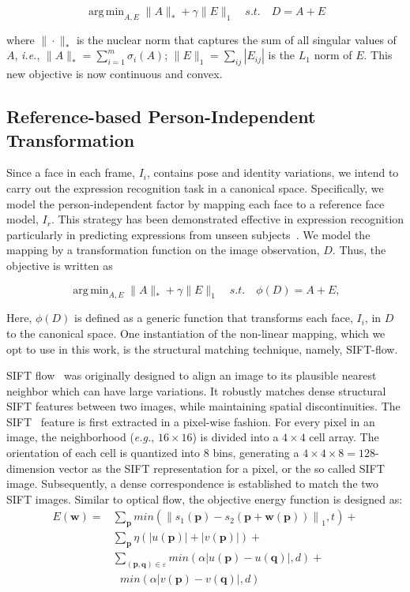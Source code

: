 \documentclass[journal]{IEEEtran}
\DeclareMathOperator*{\argmin}{arg\,min}
\begin{document}
\begin{equation} \label{eq:rpca}
\argmin_{A,E} \|A\|_*+\gamma \|E\|_1  \quad s.t. \quad D = A + E 
\end{equation}

\noindent where $\|\cdot\|_*$ is the nuclear norm that captures the sum of all singular values of $A$, \textit{i.e.}, $\|A\|_*=\sum^m_{i=1}\sigma_i(A)$; $\|E\|_1=\sum_{ij}|E_{ij}|$ is the $L_1$ norm of $E$. This new objective is now continuous and convex. 


\subsection{Reference-based Person-Independent Transformation} 

Since a face in each frame, $I_i$, contains pose and identity variations, we intend to carry out the expression recognition task in a canonical space. Specifically, we model the person-independent factor by mapping each face to a reference face model, $I_r$. This strategy has been demonstrated effective in expression recognition particularly in predicting expressions from unseen subjects~\cite{Yang_SMCB12,Dahmane_TMM14}. We model the mapping by a transformation function on the image observation, $D$. Thus, the objective is written as

\begin{equation} \label{eq:rpca}
\argmin_{A,E} \|A\|_*+\gamma \|E\|_1  \quad s.t. \quad \phi (D) = A + E, 
\end{equation}

Here, $\phi (D)$ is defined as a generic function that transforms each face, $I_i$,  in $D$ to the canonical space. One instantiation of the non-linear mapping, which we opt to use in this work, is the structural matching technique, namely, SIFT-flow. 

SIFT flow~\cite{Liu_PAMI11} was originally designed to align an image to its plausible nearest neighbor which can have large variations. It robustly matches dense structural SIFT features between two images, while maintaining spatial discontinuities. The SIFT~\cite{Lowe_ICCV99} feature is first extracted in a pixel-wise fashion. For every pixel in an image, the neighborhood (\textit{e.g.}, $16\times16$) is divided into a $4\times4$ cell array. The orientation of each cell is quantized into 8 bins, generating a $4\times4\times8=128$-dimension vector as the SIFT representation for a pixel, or the so called SIFT image. Subsequently, a dense correspondence is established to match the two SIFT images. Similar to optical flow, the objective energy function is designed as:
\begin{align}
	\label{data_term}
	E(\textbf{w})=&\sum_\textbf{p} min(\left\|s_1 (\textbf{p})-s_2 (\textbf{p}+\textbf{w}(\textbf{p}))\right\|_1 ,t)+
\\\label{small_constraint}
&\sum_\textbf{p} \eta(\left|u(\textbf{p})\right|+\left|v(\textbf{p})\right|) +
\\\nonumber
&\sum_{(\textbf{p},\textbf{q})\in\varepsilon} min(\alpha\left|u(\textbf{p})-u(\textbf{q})\right|,d)+
\\\label{smooth_constraint}
&~~~min(\alpha\left|v(\textbf{p})-v(\textbf{q})\right|,d)
\end{align}
\end{document}
